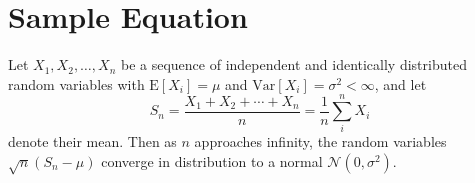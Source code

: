 \documentclass[9pt,twocolumn,twoside]{gsajnl}
\begin{document}
\section{Sample Equation}

Let $X_1, X_2, \ldots, X_n$ be a sequence of independent and identically distributed random variables with $\text{E}[X_i] = \mu$ and $\text{Var}[X_i] = \sigma^2 < \infty$, and let
\begin{equation}
S_n = \frac{X_1 + X_2 + \cdots + X_n}{n}
      = \frac{1}{n}\sum_{i}^{n} X_i
\label{eq:refname1}
\end{equation}
denote their mean. Then as $n$ approaches infinity, the random variables $\sqrt{n}(S_n - \mu)$ converge in distribution to a normal $\mathcal{N}(0, \sigma^2)$.


\end{document}
